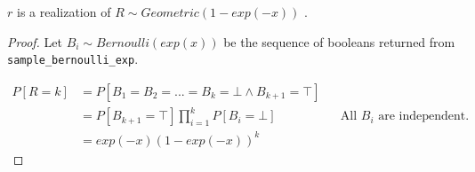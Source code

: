 \documentclass{article}
\begin{document}
\begin{theorem}
$r$ is a realization of $R \sim Geometric(1 - exp(-x))$ \cite{CKS20}.
\end{theorem}

\begin{proof}

Let $B_i \sim Bernoulli(exp(x))$ be the sequence of booleans returned from \texttt{sample\_bernoulli\_exp}.

\begin{align*}
    P[R = k] &= P[B_1 = B_2 = ... = B_k = \bot \land B_{k + 1} = \top] \\
    &= P[B_{k + 1} = \top] \prod_{i=1}^{k} P[B_i = \bot] && \text{All $B_i$ are independent.} \\
    &= exp(-x) (1 - exp(-x))^{k}
\end{align*}
\end{proof}




\end{document}

